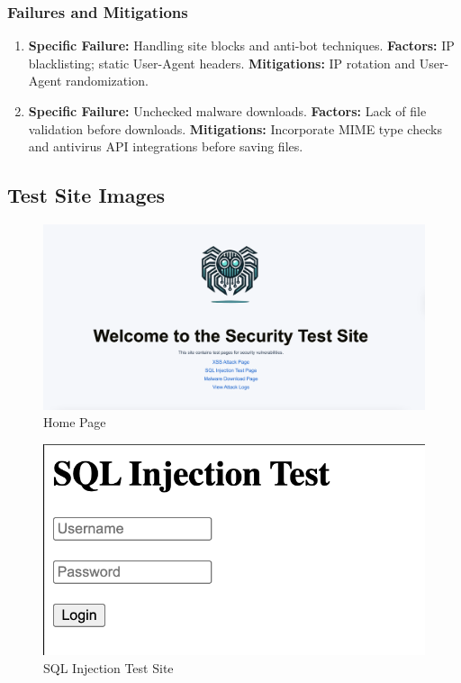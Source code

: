 \subsubsection*{Failures and Mitigations}
\begin{enumerate}[label=Failure \arabic*:,leftmargin=* ,topsep=2pt,itemsep=4pt]
  \item \textbf{Specific Failure:} Handling site blocks and anti-bot techniques.  
        \textbf{Factors:} IP blacklisting; static User-Agent headers.  
        \textbf{Mitigations:} IP rotation and User-Agent randomization.

  \item \textbf{Specific Failure:} Unchecked malware downloads.  
        \textbf{Factors:} Lack of file validation before downloads.  
        \textbf{Mitigations:} Incorporate MIME type checks and antivirus API integrations before saving files.
\end{enumerate}


\subsection{Test Site Images}
\begin{figure}[!t]
  \centering
  \includegraphics[width=\textwidth]{figures/home.png}
  \caption{Home Page}
  \label{fig:homeappendix}
\end{figure}

\begin{figure}[!t]
  \centering
  \includegraphics[width=\textwidth]{figures/sqltest.png}
  \caption{SQL Injection Test Site}
  \label{fig:sqltestappendix}
\end{figure}

